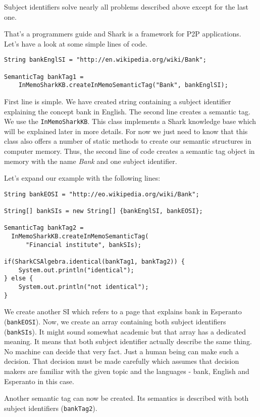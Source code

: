 Subject identifiers solve nearly all problems described above except for the last one.

That's a programmers guide and Shark is a framework for P2P applications. Let's
have a look at some simple lines of code.

\begin{verbatim}
String bankEnglSI = "http://en.wikipedia.org/wiki/Bank";

SemanticTag bankTag1 = 
    InMemoSharkKB.createInMemoSemanticTag("Bank", bankEnglSI);
\end{verbatim}

First line is simple. We have created string containing a subject identifier explaining the concept bank in English. The second line creates a semantic tag.
We use the {\tt InMemoSharkKB}. This class implements a Shark knowledge base which will be explained later in more details. For now we just need to know that this class also offers a number of static methods to create our semantic structures in computer memory. Thus, the second line of code creates a semantic tag object in memory with the name {\it Bank} and one subject identifier.

Let's expand our example with the following lines:

\begin{verbatim}
String bankEOSI = "http://eo.wikipedia.org/wiki/Bank";
        
String[] bankSIs = new String[] {bankEnglSI, bankEOSI};
        
SemanticTag bankTag2 = 
  InMemoSharkKB.createInMemoSemanticTag(
      "Financial institute", bankSIs);
        
if(SharkCSAlgebra.identical(bankTag1, bankTag2)) {
    System.out.println("identical");
} else {
    System.out.println("not identical");
}
\end{verbatim}

We create another SI which refers to a page that explains bank in Esperanto ({\tt bankEOSI}).
Now, we create an array containing both subject identifiers ({\tt bankSIs}). 
It might sound somewhat academic but that array has a dedicated meaning.
It means that both subject identifier actually describe the same thing.
No machine can decide that very fact. Just a human being can make such a decision. That decision must be made carefully
which assumes that decision makers are familiar with the given topic and 
the languages - bank, English and Esperanto in this case.

Another semantic tag can now be created. Its semantics is described with both subject identifiers ({\tt bankTag2}). 

